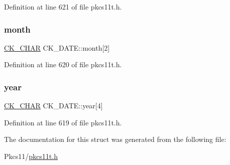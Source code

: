 Definition at line 621 of file pkcs11t.\+h.

\mbox{\label{struct_c_k___d_a_t_e_adbc049ebf70a76bb11c7b44dc6c82654}} 
\subsubsection{\texorpdfstring{month}{month}}
{\footnotesize\ttfamily \hyperlink{pkcs11t_8h_a0ed4ef152a55e26f435b876927145580}{C\+K\+\_\+\+C\+H\+AR} C\+K\+\_\+\+D\+A\+T\+E\+::month\mbox{[}2\mbox{]}}



Definition at line 620 of file pkcs11t.\+h.

\mbox{\label{struct_c_k___d_a_t_e_a223a9ead1aa935845bea0e9426317131}} 
\subsubsection{\texorpdfstring{year}{year}}
{\footnotesize\ttfamily \hyperlink{pkcs11t_8h_a0ed4ef152a55e26f435b876927145580}{C\+K\+\_\+\+C\+H\+AR} C\+K\+\_\+\+D\+A\+T\+E\+::year\mbox{[}4\mbox{]}}



Definition at line 619 of file pkcs11t.\+h.



The documentation for this struct was generated from the following file\+:\begin{DoxyCompactItemize}
\item 
Pkcs11/\hyperlink{pkcs11t_8h}{pkcs11t.\+h}\end{DoxyCompactItemize}
